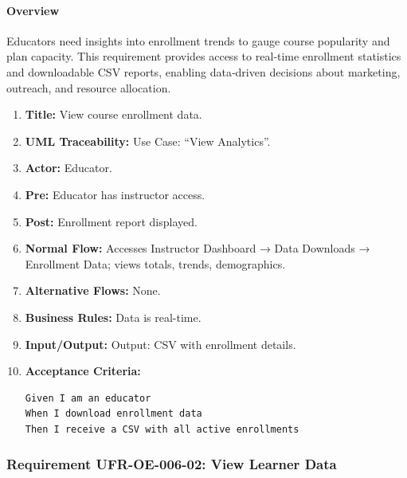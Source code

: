 \paragraph{Overview}
Educators need insights into enrollment trends to gauge course popularity and plan capacity. This requirement provides access to real‑time enrollment statistics and downloadable CSV reports, enabling data‑driven decisions about marketing, outreach, and resource allocation.
\begin{enumerate}[label=\textbf{\arabic*.}]
\item \textbf{Title:} View course enrollment data.
\item \textbf{UML Traceability:} Use Case: “View Analytics”.
\item \textbf{Actor:} Educator.
\item \textbf{Pre:} Educator has instructor access.
\item \textbf{Post:} Enrollment report displayed.
\item \textbf{Normal Flow:} Accesses Instructor Dashboard → Data Downloads → Enrollment Data; views totals, trends, demographics.
\item \textbf{Alternative Flows:} None.
\item \textbf{Business Rules:} Data is real-time.
\item \textbf{Input/Output:} Output: CSV with enrollment details.
\item \textbf{Acceptance Criteria:}
    \begin{verbatim}
Given I am an educator
When I download enrollment data
Then I receive a CSV with all active enrollments
    \end{verbatim}
\end{enumerate}

\subsubsection{Requirement UFR-OE-006-02: View Learner Data}
